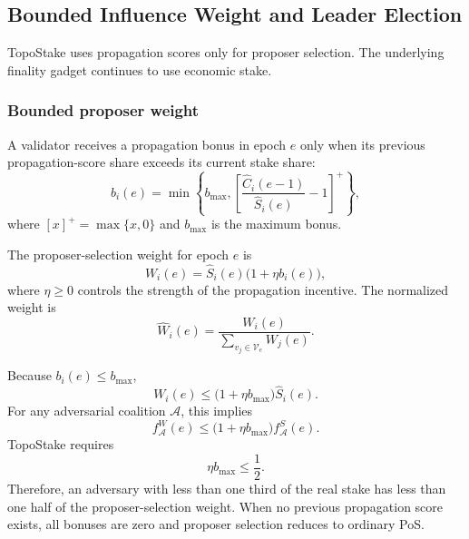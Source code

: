 \documentclass[lettersize,journal]{IEEEtran}
\begin{document}
\subsection{Bounded Influence Weight and Leader Election}
\label{subsec:bounded-influence}

TopoStake uses propagation scores only for proposer selection.
The underlying finality gadget continues to use economic stake.

\subsubsection{Bounded proposer weight}
A validator receives a propagation bonus in epoch $e$ only when its previous propagation-score share exceeds its current stake share:
\begin{equation}
\label{eq:prop_bonus}
b_i(e)
=
\min\left\{
b_{\max},
\left[
\frac{\hat C_i(e-1)}
{\hat S_i(e)}
-1
\right]^+
\right\},
\end{equation}
where $[x]^+=\max\{x,0\}$ and $b_{\max}$ is the maximum bonus.

The proposer-selection weight for epoch $e$ is
\begin{equation}
\label{eq:bounded_weight}
W_i(e)
=
\hat S_i(e)
\bigl(1+\eta b_i(e)\bigr),
\end{equation}
where $\eta\geq0$ controls the strength of the propagation incentive.
The normalized weight is
\begin{equation}
\label{eq:normalized_weight}
\hat W_i(e)
=
\frac{W_i(e)}
{\sum_{v_j\in\mathcal{V}_e}W_j(e)}.
\end{equation}

Because $b_i(e)\leq b_{\max}$,
\begin{equation}
\label{eq:weight_bound}
W_i(e)
\leq
\bigl(1+\eta b_{\max}\bigr)\hat S_i(e).
\end{equation}
For any adversarial coalition $\mathcal{A}$, this implies
\begin{equation}
\label{eq:coalition_weight_bound}
f_{\mathcal{A}}^{W}(e)
\leq
\bigl(1+\eta b_{\max}\bigr)
f_{\mathcal{A}}^{S}(e).
\end{equation}
TopoStake requires
\begin{equation}
\label{eq:bonus_parameter_bound}
\eta b_{\max}\leq\frac{1}{2}.
\end{equation}
Therefore, an adversary with less than one third of the real stake has less than one half of the proposer-selection weight.
When no previous propagation score exists, all bonuses are zero and proposer selection reduces to ordinary PoS.
\end{document}

